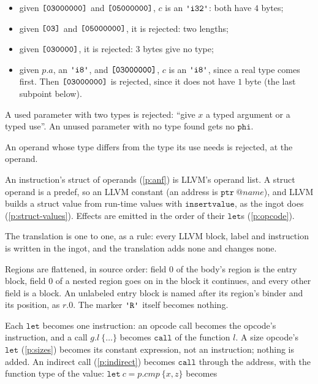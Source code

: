 \documentclass[11pt,letterpaper]{article}
\newcommand{\kw}[1]{\mathtt{#1}}
\newcommand{\str}[1]{\text{\ttfamily\textquotesingle #1\textquotesingle}}  %
\newcommand{\hex}[1]{\text{\ttfamily [#1]}}  %
\newcounter{pt}
\newcommand{\pref}[1]{\ref{#1}}  %
\begin{document}
\begin{points}
\begin{subpoints}
\begin{itemize}
    \item given $\hex{03000000}$ and $\hex{05000000}$, $c$ is an $\str{i32}$: both have $4$ bytes;
    \item given $\hex{03}$ and $\hex{05000000}$, it is rejected: two lengths;
    \item given $\hex{030000}$, it is rejected: $3$ bytes give no type;
    \item given $p.a$, an $\str{i8}$, and $\hex{03000000}$, $c$ is an $\str{i8}$, since a real type comes first. Then
      $\hex{03000000}$ is rejected, since it does not have $1$ byte (the last subpoint below).
    \end{itemize}
  \item A used parameter with two types is rejected: ``give $x$ a typed argument or a
    typed use''. An unused parameter with no type found gets no $\kw{phi}$.
  \item An operand whose type differs from the type its use needs is rejected, at the operand.
  \end{subpoints}
\item\label{p:llvm-ops} An instruction's struct of operands (\pref{p:anf}) is LLVM's operand list. A struct operand is a predef,
  so an LLVM constant (an address is $\kw{ptr}\ @\mathit{name}$), and LLVM builds a struct value from run-time values with $\kw{insertvalue}$, as the
  ingot does (\pref{p:struct-values}). Effects are emitted in the order of their $\kw{let}$s (\pref{p:opcode}).
\item\label{p:one-to-one} The translation is one to one, as a rule: every LLVM block, label and instruction is
  written in the ingot, and the translation adds none and changes none.
  \begin{subpoints}
  \item Regions are flattened, in source order: field $0$ of the body's region is the entry block, field $0$ of a
    nested region goes on in the block it continues, and every other field is a block. An unlabeled entry block is
    named after its region's binder and its position, as $r.0$. The marker $\str{R}$ itself becomes nothing.
  \item Each $\kw{let}$ becomes one instruction: an opcode call becomes the opcode's instruction, and a
    call $g.l\ \{\dots\}$ becomes $\kw{call}$ of the function $l$. A size opcode's $\kw{let}$ (\pref{p:sizes}) becomes its constant
    expression, not an instruction; nothing is added. An indirect call (\pref{p:indirect}) becomes $\kw{call}$ through the
    address, with the function type of the value: $\kw{let}\ c = p.\mathit{cmp}\ \{x, z\}$ becomes

\end{subpoints}
\end{points}
\end{document}

